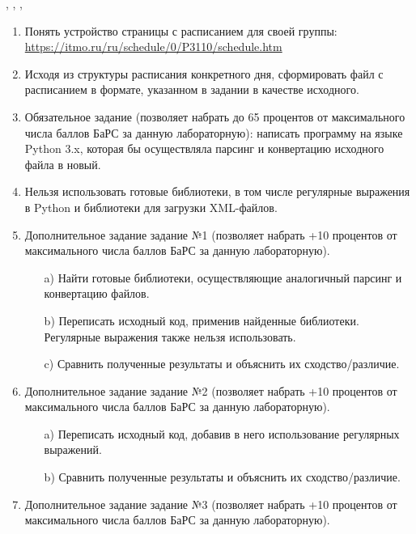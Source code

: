 
\Chapter{\lab\ \labnumber}{\labtheme}

\begin{center}
    {, , ,}
\end{center} 
\begin{enumerate}
    \item Понять устройство страницы с расписанием для своей группы: \url{https://itmo.ru/ru/schedule/0/P3110/schedule.htm}
\item Исходя из структуры расписания конкретного дня, сформировать файл с расписанием в формате, указанном в задании в качестве исходного.
\item Обязательное задание (позволяет набрать до 65 процентов от  максимального числа баллов БаРС за данную лабораторную): написать  программу на языке Python 3.x, которая бы осуществляла парсинг и  конвертацию исходного файла в новый.
\item Нельзя использовать готовые библиотеки, в том числе регулярные  выражения в Python и библиотеки для загрузки XML-файлов.
\item Дополнительное задание задание №1 (позволяет набрать +10 процентов  от максимального числа баллов БаРС за данную лабораторную).
    \begin{itemize}
        \item[a)] Найти готовые библиотеки, осуществляющие аналогичный  парсинг и конвертацию файлов.
        \item[b)] Переписать исходный код, применив найденные библиотеки.  Регулярные выражения также нельзя использовать.
        \item[c)] Сравнить полученные результаты и объяснить их  сходство/различие.
    \end{itemize}
\item Дополнительное задание задание №2 (позволяет набрать +10 процентов  от максимального числа баллов БаРС за данную лабораторную).
    \begin{itemize}
        \item[a)] Переписать исходный код, добавив в него использование  регулярных выражений.
        \item[b)] Сравнить полученные результаты и объяснить их  сходство/различие.
    \end{itemize}
\item Дополнительное задание задание №3 (позволяет набрать +10 процентов  от максимального числа баллов БаРС за данную лабораторную).

\end{enumerate}
